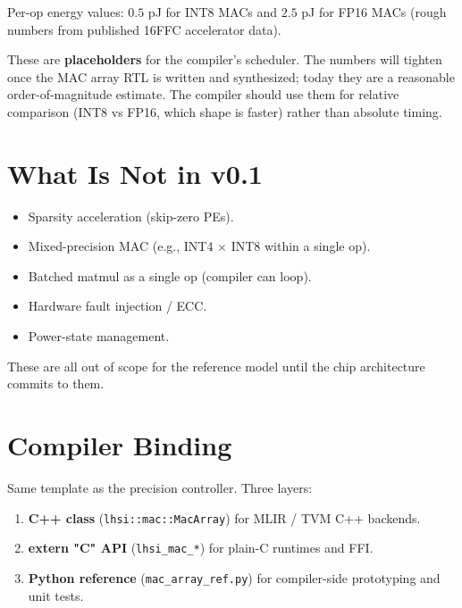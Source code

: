 \documentclass[11pt]{article}
\begin{document}
\noindent
Per-op energy values: $0.5$ pJ for INT8 MACs and $2.5$ pJ for FP16
MACs (rough numbers from published 16FFC accelerator data).

These are \textbf{placeholders} for the compiler's scheduler. The
numbers will tighten once the MAC array RTL is written and synthesized;
today they are a reasonable order-of-magnitude estimate. The compiler
should use them for relative comparison (INT8 vs FP16, which shape is
faster) rather than absolute timing.

\section{What Is Not in v0.1}
\label{sec:exclusions}

\begin{itemize}
\item Sparsity acceleration (skip-zero PEs).
\item Mixed-precision MAC (e.g., INT4 $\times$ INT8 within a single op).
\item Batched matmul as a single op (compiler can loop).
\item Hardware fault injection / ECC.
\item Power-state management.
\end{itemize}

These are all out of scope for the reference model until the chip
architecture commits to them.

\section{Compiler Binding}
\label{sec:binding}

Same template as the precision controller. Three layers:

\begin{enumerate}
\item \textbf{C++ class} (\texttt{lhsi::mac::MacArray}) for MLIR / TVM
      C++ backends.
\item \textbf{extern "C" API} (\texttt{lhsi\_mac\_*}) for plain-C
      runtimes and FFI.
\item \textbf{Python reference} (\texttt{mac\_array\_ref.py}) for
      compiler-side prototyping and unit tests.
\end{enumerate}
\end{document}
